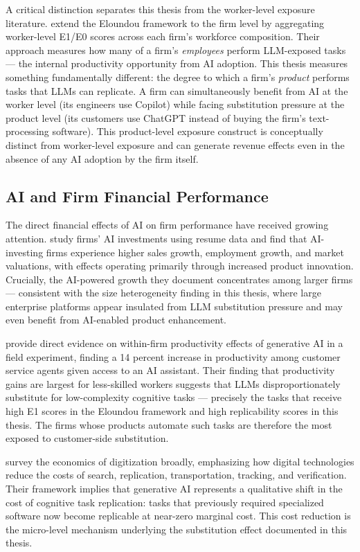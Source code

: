 \documentclass[12pt,a4paper]{article}
\begin{document}
A critical distinction separates this thesis from the worker-level exposure literature. \citet{labaschin2025} extend the Eloundou framework to the firm level by aggregating worker-level E1/E0 scores across each firm's workforce composition. Their approach measures how many of a firm's \emph{employees} perform LLM-exposed tasks --- the internal productivity opportunity from AI adoption. This thesis measures something fundamentally different: the degree to which a firm's \emph{product} performs tasks that LLMs can replicate. A firm can simultaneously benefit from AI at the worker level (its engineers use Copilot) while facing substitution pressure at the product level (its customers use ChatGPT instead of buying the firm's text-processing software). This product-level exposure construct is conceptually distinct from worker-level exposure and can generate revenue effects even in the absence of any AI adoption by the firm itself.

\subsection{AI and Firm Financial Performance}

The direct financial effects of AI on firm performance have received growing attention. \citet{babina2024} study firms' AI investments using resume data and find that AI-investing firms experience higher sales growth, employment growth, and market valuations, with effects operating primarily through increased product innovation. Crucially, the AI-powered growth they document concentrates among larger firms --- consistent with the size heterogeneity finding in this thesis, where large enterprise platforms appear insulated from LLM substitution pressure and may even benefit from AI-enabled product enhancement.

\citet{brynjolfsson2023} provide direct evidence on within-firm productivity effects of generative AI in a field experiment, finding a 14 percent increase in productivity among customer service agents given access to an AI assistant. Their finding that productivity gains are largest for less-skilled workers suggests that LLMs disproportionately substitute for low-complexity cognitive tasks --- precisely the tasks that receive high E1 scores in the Eloundou framework and high replicability scores in this thesis. The firms whose products automate such tasks are therefore the most exposed to customer-side substitution.

\citet{goldfarb2019} survey the economics of digitization broadly, emphasizing how digital technologies reduce the costs of search, replication, transportation, tracking, and verification. Their framework implies that generative AI represents a qualitative shift in the cost of cognitive task replication: tasks that previously required specialized software now become replicable at near-zero marginal cost. This cost reduction is the micro-level mechanism underlying the substitution effect documented in this thesis.
\end{document}
